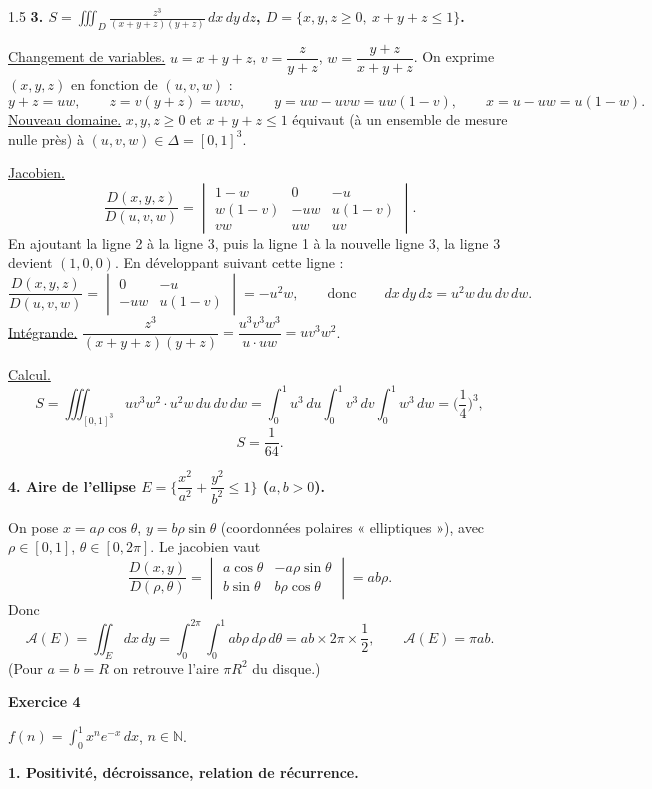 \documentclass[12pt]{article}
\begin{document}
\begin{spacing}{1.5}
\textbf{3. $S=\displaystyle\iiint_D\frac{z^3}{(x+y+z)(y+z)}\,dx\,dy\,dz$, \quad $D=\{x,y,z\ge0,\ x+y+z\le1\}$.}

\underline{Changement de variables.} $u=x+y+z$, $v=\dfrac{z}{y+z}$, $w=\dfrac{y+z}{x+y+z}$. On exprime $(x,y,z)$ en fonction de $(u,v,w)$ :
\[
y+z=uw,\qquad z=v(y+z)=uvw,\qquad y=uw-uvw=uw(1-v),\qquad x=u-uw=u(1-w).
\]
\underline{Nouveau domaine.} $x,y,z\ge0$ et $x+y+z\le1$ équivaut (à un ensemble de mesure nulle près) à $(u,v,w)\in\Delta=[0,1]^3$.

\underline{Jacobien.}
\[
\frac{D(x,y,z)}{D(u,v,w)}=\begin{vmatrix}
1-w & 0 & -u\\
w(1-v) & -uw & u(1-v)\\
vw & uw & uv
\end{vmatrix}.
\]
En ajoutant la ligne 2 à la ligne 3, puis la ligne 1 à la nouvelle ligne 3, la ligne 3 devient $(1,0,0)$. En développant suivant cette ligne :
\[
\frac{D(x,y,z)}{D(u,v,w)}=\begin{vmatrix}0&-u\\-uw&u(1-v)\end{vmatrix}=-u^2w,\qquad\text{donc}\qquad dx\,dy\,dz=u^2w\,du\,dv\,dw .
\]
\underline{Intégrande.} $\dfrac{z^3}{(x+y+z)(y+z)}=\dfrac{u^3v^3w^3}{u\cdot uw}=uv^3w^2$.

\underline{Calcul.}
\[
S=\iiint_{[0,1]^3}uv^3w^2\cdot u^2w\,du\,dv\,dw=\int_0^1u^3\,du\int_0^1v^3\,dv\int_0^1w^3\,dw=\Big(\frac14\Big)^3,
\]
\[
\boxed{S=\frac1{64}}.
\]

\textbf{4. Aire de l'ellipse $E=\Big\{\dfrac{x^2}{a^2}+\dfrac{y^2}{b^2}\le1\Big\}$ ($a,b>0$).}

On pose $x=a\rho\cos\theta$, $y=b\rho\sin\theta$ (coordonnées polaires « elliptiques »), avec $\rho\in[0,1]$, $\theta\in[0,2\pi]$. Le jacobien vaut
\[
\frac{D(x,y)}{D(\rho,\theta)}=\begin{vmatrix}a\cos\theta&-a\rho\sin\theta\\b\sin\theta&b\rho\cos\theta\end{vmatrix}=ab\rho .
\]
Donc
\[
\mathcal{A}(E)=\iint_Edx\,dy=\int_0^{2\pi}\int_0^1ab\rho\,d\rho\,d\theta=ab\times2\pi\times\frac12,\qquad\boxed{\mathcal{A}(E)=\pi ab}.
\]
(Pour $a=b=R$ on retrouve l'aire $\pi R^2$ du disque.)

\medskip\textbf{Exercice 4}

$f(n)=\displaystyle\int_0^1x^ne^{-x}\,dx$, $n\in\mathbb{N}$.

\textbf{1. Positivité, décroissance, relation de récurrence.}


\end{spacing}
\end{document}
